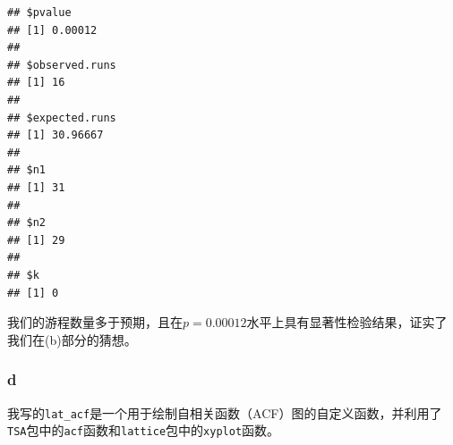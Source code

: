 \documentclass[
]{article}
\begin{document}
\begin{verbatim}
## $pvalue
## [1] 0.00012
## 
## $observed.runs
## [1] 16
## 
## $expected.runs
## [1] 30.96667
## 
## $n1
## [1] 31
## 
## $n2
## [1] 29
## 
## $k
## [1] 0
\end{verbatim}

我们的游程数量多于预期，且在\(p = 0.00012\)水平上具有显著性检验结果，证实了我们在(b)部分的猜想。

\hypertarget{d-3}{%
\subsubsection*{d}\label{d-3}}

我写的\texttt{lat\_acf}是一个用于绘制自相关函数（ACF）图的自定义函数，并利用了\texttt{TSA}包中的\texttt{acf}函数和\texttt{lattice}包中的\texttt{xyplot}函数。
\end{document}
